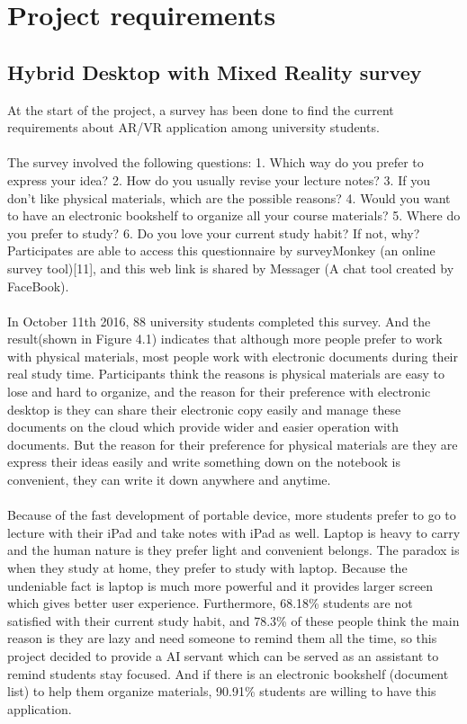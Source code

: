 
\chapter{Project requirements} %

\label{Chapter4} %
\section{Hybrid Desktop with Mixed Reality survey}
At the start of the project, a survey has been done to find the current requirements about AR/VR application among university students.
\\
\\
The survey involved the following questions: 1. Which way do you prefer to express your idea? 2. How do you usually revise your lecture notes? 3. If you don’t like physical materials, which are the possible reasons? 4. Would you want to have an electronic bookshelf to organize all your course materials? 5. Where do you prefer to study? 6. Do you love your current study habit? If not, why? Participates are able to access this questionnaire by surveyMonkey (an online survey tool)[11], and this web link is shared by Messager (A chat tool created by FaceBook). 
\\
\\
In October 11th 2016, 88 university students completed this survey. And the result(shown in Figure 4.1) indicates that although more people prefer to work with physical materials, most people work with electronic documents during their real study time. Participants think the reasons is physical materials are easy to lose and hard to organize, and the reason for their preference with electronic desktop is they can share their electronic copy easily and manage these documents on the cloud which provide wider and easier operation with documents. But the reason for their preference for physical materials are they are express their ideas easily and write something down on the notebook is convenient, they can write it down anywhere and anytime. 
\\
\\
Because of the fast development of portable device, more students prefer to go to lecture with their iPad and take notes with iPad as well. Laptop is heavy to carry and the human nature is they prefer light and convenient belongs. The paradox is when they study at home, they prefer to study with laptop. Because the undeniable fact is laptop is much more powerful and it provides larger screen which gives better user experience. Furthermore, 68.18\% students are not satisfied with their current study habit, and 78.3\% of these people think the main reason is they are lazy and need someone to remind them all the time, so this project decided to provide a AI servant which can be served as an assistant to remind students stay focused. And if there is an electronic bookshelf (document list) to help them organize materials, 90.91\% students are willing to have this application. 
